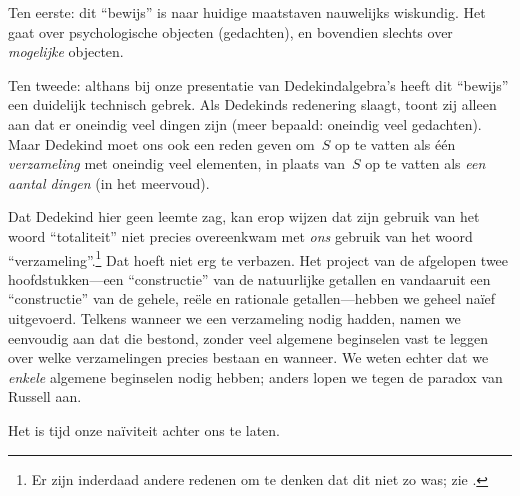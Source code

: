 \documentclass[../../../include/open-logic-section]{subfiles}
\begin{document}
Ten eerste: dit ``bewijs'' is naar huidige maatstaven nauwelijks
wiskundig. Het gaat over psychologische objecten (gedachten), en
bovendien slechts over \emph{mogelijke} objecten.

Ten tweede: althans bij onze presentatie van Dedekindalgebra's heeft dit
``bewijs'' een duidelijk technisch gebrek. Als Dedekinds redenering
slaagt, toont zij alleen aan dat er oneindig veel dingen zijn (meer
bepaald: oneindig veel gedachten). Maar Dedekind moet ons ook een reden
geven om~$S$ op te vatten als één \emph{verzameling} met oneindig veel
elementen, in plaats van~$S$ op te vatten als \emph{een aantal
dingen} (in het meervoud).

Dat Dedekind hier geen leemte zag, kan erop wijzen dat zijn gebruik van
het woord ``totaliteit'' niet precies overeenkwam met \emph{ons} gebruik
van het woord ``verzameling''.\footnote{Er zijn inderdaad andere redenen
om te denken dat dit niet zo was; zie \citet[p.~23]{Potter2004}.} Dat
hoeft niet erg te verbazen. Het project van de afgelopen twee
hoofdstukken---een ``constructie'' van de natuurlijke getallen en
vandaaruit een ``constructie'' van de gehele, reële en rationale
getallen---hebben we geheel na\"ief uitgevoerd. Telkens wanneer we een
verzameling nodig hadden, namen we eenvoudig aan dat die bestond, zonder
veel algemene beginselen vast te leggen over welke verzamelingen precies
bestaan en wanneer. We weten echter dat we \emph{enkele} algemene
beginselen nodig hebben; anders lopen we tegen de paradox van Russell
aan.

Het is tijd onze na\"iviteit achter ons te laten.
\end{document}
